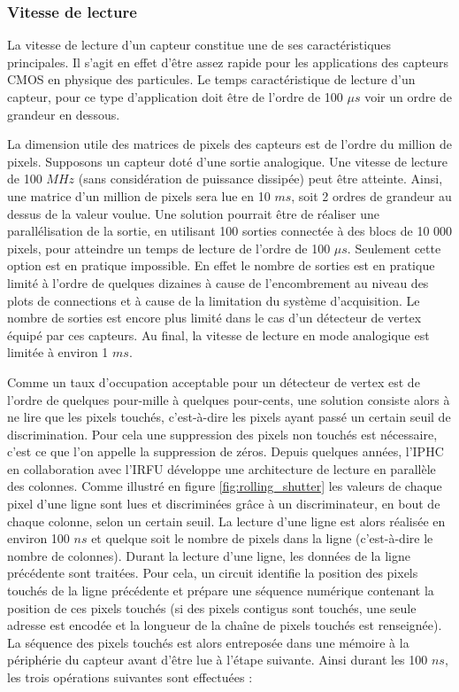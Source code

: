    \subsubsection{Vitesse de lecture}
   
   La vitesse de lecture d'un capteur constitue une de ses caract\'eristiques principales. Il s'agit en effet d'\^etre assez rapide pour les applications des capteurs CMOS en physique des particules. Le temps caract\'eristique de lecture d'un capteur, pour ce type d'application doit être de l'ordre de 100 $\mu s$ voir un ordre de grandeur en dessous.
   
   \medskip
   
   La dimension utile des matrices de pixels des capteurs est de l'ordre du million de pixels. Supposons un capteur dot\'e d'une sortie analogique. Une vitesse de lecture de 100 $MHz$ (sans consid\'eration de puissance dissip\'ee) peut \^etre atteinte. Ainsi, une matrice d'un million de pixels sera lue en 10 $ms$, soit 2 ordres de grandeur au dessus de la valeur voulue. Une solution pourrait \^etre de r\'ealiser une parall\'elisation de la sortie, en utilisant 100 sorties connect\'ee \`a des blocs de 10 000 pixels, pour atteindre un temps de lecture de l'ordre de 100 $\mu s$. Seulement cette option est en pratique impossible. En effet le nombre de sorties est en pratique limit\'e \`a l'ordre de quelques dizaines \`a cause de l'encombrement au niveau des plots de connections et à cause de la limitation du syst\`eme d'acquisition. Le nombre de sorties est encore plus limit\'e dans le cas d'un d\'etecteur de vertex \'equip\'e par ces capteurs. Au final, la vitesse de lecture en mode analogique est limit\'ee \`a environ 1 $ms$.

   \medskip

   Comme un taux d'occupation acceptable pour un d\'etecteur de vertex est de l'ordre de quelques pour-mille \`a quelques pour-cents, une solution consiste alors \`a ne lire que les pixels touch\'es, c'est-\`a-dire les pixels ayant pass\'e un certain seuil de discrimination. Pour cela une suppression des pixels non touch\'es est n\'ecessaire, c'est ce que l'on appelle la suppression de z\'eros. Depuis quelques ann\'ees, l'IPHC en collaboration avec l'IRFU d\'eveloppe une architecture de lecture en parall\`ele des colonnes. Comme illustr\'e en figure \ref{fig:rolling_shutter} les valeurs de chaque pixel d'une ligne sont lues et discrimin\'ees gr\^ace \`a un discriminateur, en bout de chaque colonne, selon un certain seuil. La lecture d'une ligne est alors r\'ealis\'ee en environ 100 $ns$ et quelque soit le nombre de pixels dans la ligne (c'est-\`a-dire le nombre de colonnes). Durant la lecture d'une ligne, les donn\'ees de la ligne pr\'ec\'edente sont trait\'ees. Pour cela, un circuit identifie la position des pixels touch\'es de la ligne pr\'ec\'edente et pr\'epare une s\'equence num\'erique contenant la position de ces pixels touch\'es (si des pixels contigus sont touch\'es, une seule adresse est encod\'ee et la longueur de la chaîne de pixels touch\'es est renseign\'ee). La séquence des pixels touch\'es est alors entrepos\'ee dans une m\'emoire \`a la p\'eriph\'erie du capteur avant d'\^etre lue \`a l'\'etape suivante. Ainsi durant les 100 $ns$, les trois op\'erations suivantes sont effectu\'ees :
   
